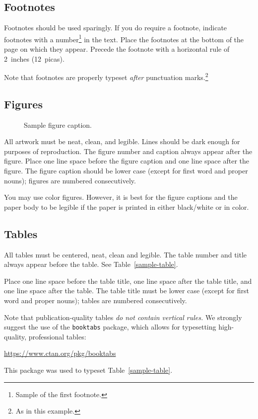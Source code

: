 \documentclass{article}
\begin{document}
\subsection{Footnotes}

Footnotes should be used sparingly.  If you do require a footnote, indicate
footnotes with a number\footnote{Sample of the first footnote.} in the
text. Place the footnotes at the bottom of the page on which they appear.
Precede the footnote with a horizontal rule of 2~inches (12~picas).

Note that footnotes are properly typeset \emph{after} punctuation
marks.\footnote{As in this example.}

\subsection{Figures}

\begin{figure}
    \centering
    \fbox{\rule[-.5cm]{0cm}{4cm} \rule[-.5cm]{4cm}{0cm}}
    \caption{Sample figure caption.}
\end{figure}

All artwork must be neat, clean, and legible. Lines should be dark enough for
purposes of reproduction. The figure number and caption always appear after the
figure. Place one line space before the figure caption and one line space after
the figure. The figure caption should be lower case (except for first word and
proper nouns); figures are numbered consecutively.

You may use color figures.  However, it is best for the figure captions and the
paper body to be legible if the paper is printed in either black/white or in
color.

\subsection{Tables}

All tables must be centered, neat, clean and legible.  The table number and
title always appear before the table.  See Table~\ref{sample-table}.

Place one line space before the table title, one line space after the
table title, and one line space after the table. The table title must
be lower case (except for first word and proper nouns); tables are
numbered consecutively.

Note that publication-quality tables \emph{do not contain vertical rules.} We
strongly suggest the use of the \verb+booktabs+ package, which allows for
typesetting high-quality, professional tables:
\begin{center}
    \url{https://www.ctan.org/pkg/booktabs}
\end{center}
This package was used to typeset Table~\ref{sample-table}.
\end{document}

